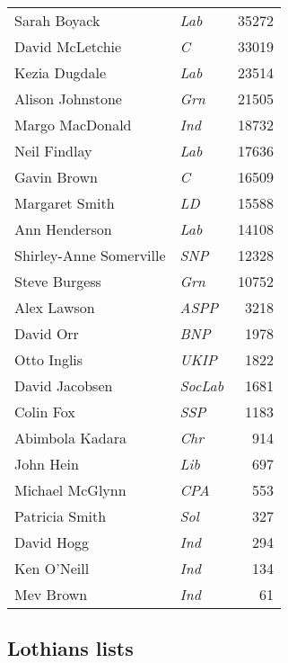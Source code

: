 {\footnotesize
\begin{tabular*}{\columnwidth}{@{\extracolsep{\fill}} p{} >{\itshape}l r @{\extracolsep{\fill}}}
Sarah Boyack & Lab & 35272\\%
David McLetchie & C & 33019\\%
Kezia Dugdale & Lab & 23514\\%
Alison Johnstone & Grn & 21505\\%
Margo MacDonald & Ind & 18732\\%
Neil Findlay & Lab & 17636\\%
Gavin Brown & C & 16509\\%
\hline
Margaret Smith & LD & 15588\\
Ann Henderson & Lab & 14108\\
Shirley-Anne Somerville & SNP & 12328\\
Steve Burgess & Grn & 10752\\
Alex Lawson & ASPP & 3218\\
David Orr & BNP & 1978\\
Otto Inglis & UKIP & 1822\\
David Jacobsen & SocLab & 1681\\
Colin Fox & SSP & 1183\\
Abimbola Kadara & Chr & 914\\
John Hein & Lib & 697\\
%
%
Michael McGlynn & CPA & 553\\
Patricia Smith & Sol & 327\\
David Hogg & Ind & 294\\
Ken O'Neill & Ind & 134\\
Mev Brown & Ind & 61\\
\end{tabular*}

}

\vfill

\subsection*{Lothians lists}

